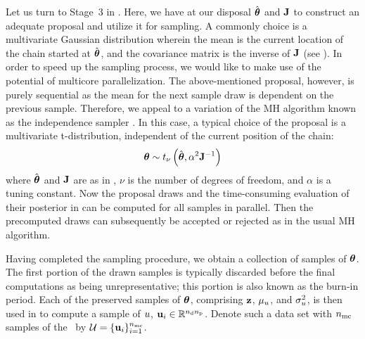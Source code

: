 Let us turn to Stage~3 in .
Here, we have at our disposal $\hat{{\boldsymbol\theta}}$ and $\mathbf{J}$ to construct an adequate proposal and utilize it for sampling.
A commonly choice is a multivariate Gaussian distribution wherein the mean is the current location of the chain started at $\hat{{\boldsymbol\theta}}$, and the covariance matrix is the inverse of $\mathbf{J}$ (see \cite{gelman2004, bernardo2007}).
In order to speed up the sampling process, we would like to make use of the potential of multicore parallelization.
The above-mentioned proposal, however, is purely sequential as the mean for the next sample draw is dependent on the previous sample.
Therefore, we appeal to a variation of the MH algorithm known as the independence sampler \cite{gelman2004}.
In this case, a typical choice of the proposal is a multivariate t-distribution, independent of the current position of the chain:
\begin{equation} \elabel{proposal}
  \vparam \sim \studentst{\nu}{\hat{\vparam}}{\alpha^2 \mOI^{-1}}
\end{equation}
where $\hat{{\boldsymbol\theta}}$ and $\mathbf{J}$ are as in , $\nu$ is the number of degrees of freedom, and $\alpha$ is a tuning constant.
Now the proposal draws and the time-consuming evaluation of their posterior in  can be computed for all samples in parallel.
Then the precomputed draws can subsequently be accepted or rejected as in the usual MH algorithm.

Having completed the sampling procedure, we obtain a collection of samples of ${\boldsymbol\theta}$. The first portion of the drawn samples is typically discarded before the final computations as being unrepresentative; this portion is also known as the burn-in period.
Each of the preserved samples of ${\boldsymbol\theta}$, comprising $\mathbf{z}$, $\mu_u$, and $\sigma^2_u$, is then used in  to compute a sample of $u$, $\mathbf{u}_i \in \mathbb{R}^{{n_\text{d}} {n_\text{p}}}$.
Denote such a data set with ${n_\text{mc}}$ samples of the \qoi\ by $\mathcal{U} = \{ \mathbf{u}_i \}_{i = 1}^{n_\text{mc}}$.
